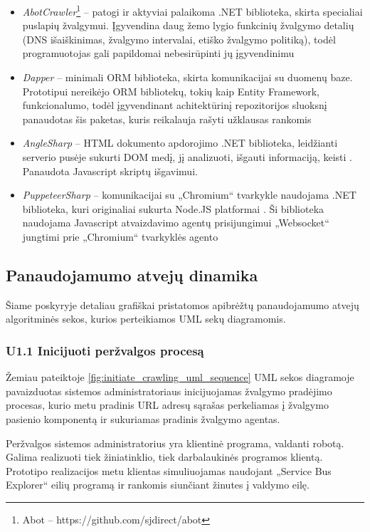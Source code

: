 \begin{itemize}
    \item \textit{AbotCrawler}\footnote{Abot -- https://github.com/sjdirect/abot} -- patogi ir aktyviai palaikoma .NET biblioteka, skirta specialiai puslapių žvalgymui. Įgyvendina daug žemo lygio funkcinių žvalgymo detalių (DNS išaiškinimas, žvalgymo intervalai, etiško žvalgymo politiką), todėl programuotojas gali papildomai nebesirūpinti jų įgyvendinimu
    \item \textit{Dapper} -- minimali ORM biblioteka, skirta komunikacijai su duomenų baze. Prototipui nereikėjo ORM bibliotekų, tokių kaip Entity Framework, funkcionalumo, todėl įgyvendinant achitektūrinį repozitorijos sluoksnį panaudotas šis paketas, kuris reikalauja rašyti užklausas rankomis \cite{DapperORM}
     \item \textit{AngleSharp} -- HTML dokumento apdorojimo .NET biblioteka, leidžianti serverio pusėje sukurti DOM medį, jį analizuoti, išgauti informaciją, keisti \cite{AngleSharp}. Panaudota Javascript skriptų išgavimui.
      \item \textit{PuppeteerSharp} -- komunikacijai su „Chromium“ tvarkykle naudojama .NET biblioteka, kuri originaliai sukurta Node.JS platformai \cite{PuppeteerSharp}. Ši biblioteka naudojama Javascript atvaizdavimo agentų prisijungimui „Websocket“ jungtimi prie „Chromium“ tvarkyklės agento
\end{itemize}

\subsection{Panaudojamumo atvejų dinamika}

Šiame poskyryje detaliau grafiškai pristatomos apibrėžtų panaudojamumo atvejų algoritminės sekos, kurios perteikiamos UML sekų diagramomis. 

\subsubsection{U1.1 Inicijuoti peržvalgos procesą}

Žemiau pateiktoje \ref{fig:initiate_crawling_uml_sequence} UML sekos diagramoje pavaizduotas sistemos administratoriaus inicijuojamas žvalgymo pradėjimo procesas, kurio metu pradinis URL adresų sąrašas perkeliamas į žvalgymo pasienio komponentą ir sukuriamas pradinis žvalgymo agentas.


Peržvalgos sistemos administratorius yra klientinė programa, valdanti robotą. Galima realizuoti tiek žiniatinklio, tiek darbalaukinės programos klientą. Prototipo realizacijos metu klientas simuliuojamas naudojant „Service Bus Explorer“ eilių programą ir rankomis siunčiant žinutes į valdymo eilę.

